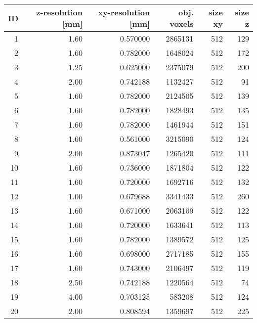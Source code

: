 \begin{tabular}{rrrrrr}
\toprule
 ID &  z-resolution [mm] &  xy-resolution [mm] &  obj. voxels &  size xy &  size z \\
\midrule
  1 &               1.60 &            0.570000 &      2865131 &      512 &     129 \\
  2 &               1.60 &            0.782000 &      1648024 &      512 &     172 \\
  3 &               1.25 &            0.625000 &      2375079 &      512 &     200 \\
  4 &               2.00 &            0.742188 &      1132427 &      512 &      91 \\
  5 &               1.60 &            0.782000 &      2124505 &      512 &     139 \\
  6 &               1.60 &            0.782000 &      1828493 &      512 &     135 \\
  7 &               1.60 &            0.782000 &      1461944 &      512 &     151 \\
  8 &               1.60 &            0.561000 &      3215090 &      512 &     124 \\
  9 &               2.00 &            0.873047 &      1265420 &      512 &     111 \\
 10 &               1.60 &            0.736000 &      1871804 &      512 &     122 \\
 11 &               1.60 &            0.720000 &      1692716 &      512 &     132 \\
 12 &               1.00 &            0.679688 &      3341433 &      512 &     260 \\
 13 &               1.60 &            0.671000 &      2063109 &      512 &     122 \\
 14 &               1.60 &            0.720000 &      1633641 &      512 &     113 \\
 15 &               1.60 &            0.782000 &      1389572 &      512 &     125 \\
 16 &               1.60 &            0.698000 &      2717185 &      512 &     155 \\
 17 &               1.60 &            0.743000 &      2106497 &      512 &     119 \\
 18 &               2.50 &            0.742188 &      1220564 &      512 &      74 \\
 19 &               4.00 &            0.703125 &       583208 &      512 &     124 \\
 20 &               2.00 &            0.808594 &      1359697 &      512 &     225 \\
\bottomrule
\end{tabular}
